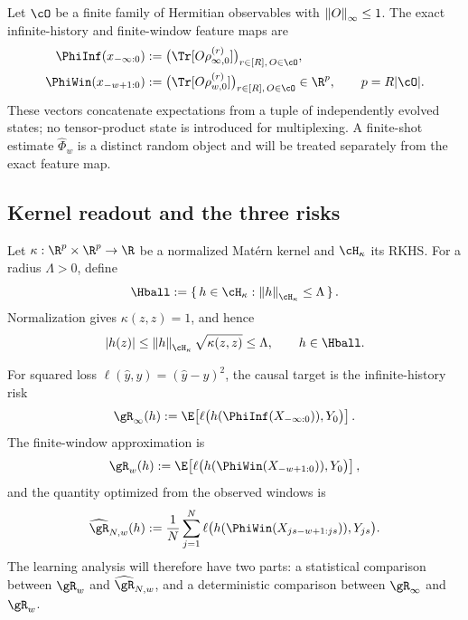 Let \(\cO\) be a finite family of Hermitian observables with
\(\left\lVert O\right\rVert_{\infty}\leq1\). The exact infinite-history and finite-window feature maps
are
\begin{align}
    \PhiInf(x_{-\infty:0})
    &:=
    \bigl(
      \Tr[O\rho_{\infty,0}^{(r)}]
    \bigr)_{r\in[R],\,O\in\cO},
    \label{eq:infinite-feature}\\
    \PhiWin(x_{-w+1:0})
    &:=
    \bigl(
      \Tr[O\rho_{w,0}^{(r)}]
    \bigr)_{r\in[R],\,O\in\cO}
    \in\R^{p},
    \qquad p=R|\cO|.
    \label{eq:window-feature}
\end{align}
These vectors concatenate expectations from a tuple of independently evolved
states; no tensor-product state is introduced for multiplexing. A finite-shot
estimate \(\widehat\Phi_w\) is a distinct random object and will be treated
separately from the exact feature map.

\subsection{Kernel readout and the three risks}

Let \(\kappa:\R^p\times\R^p\to\R\) be a normalized Mat\'ern kernel and
\(\cH_\kappa\) its RKHS. For a radius \(\Lambda>0\), define
\[
    \Hball
    :=
    \set{h\in\cH_\kappa:\norm{h}_{\cH_\kappa}\leq\Lambda}.
\]
Normalization gives \(\kappa(z,z)=1\), and hence
\begin{equation}
    \abs{h(z)}
    \leq\norm{h}_{\cH_\kappa}\sqrt{\kappa(z,z)}
    \leq\Lambda,
    \qquad h\in\Hball.
    \label{eq:prediction-bound}
\end{equation}

For squared loss \(\ell(\widehat y,y)=(\widehat y-y)^2\), the causal target is
the infinite-history risk
\begin{equation}
    \risk_\infty(h)
    :=
    \E\!\left[
      \ell\bigl(h(\PhiInf(X_{-\infty:0})),Y_0\bigr)
    \right].
    \label{eq:infinite-risk}
\end{equation}
The finite-window approximation is
\begin{equation}
    \risk_w(h)
    :=
    \E\!\left[
      \ell\bigl(h(\PhiWin(X_{-w+1:0})),Y_0\bigr)
    \right],
    \label{eq:window-risk}
\end{equation}
and the quantity optimized from the observed windows is
\begin{equation}
    \erisk_{N,w}(h)
    :=
    \frac1N\sum_{j=1}^N
    \ell\bigl(h(\PhiWin(X_{js-w+1:js})),Y_{js}\bigr).
    \label{eq:empirical-risk}
\end{equation}
The learning analysis will therefore have two parts: a statistical comparison
between \(\risk_w\) and \(\erisk_{N,w}\), and a deterministic comparison between
\(\risk_\infty\) and \(\risk_w\).

